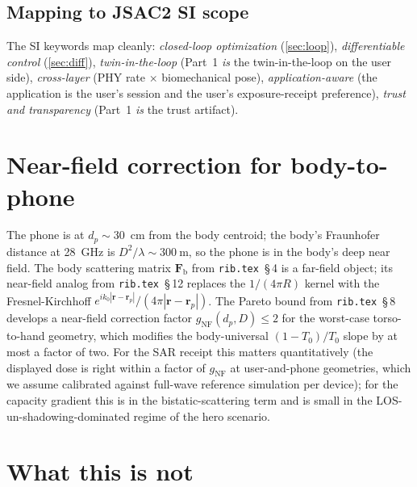 \documentclass[11pt,a4paper]{article}
\theoremstyle{definition}
\newcommand{\rr}{\mathbf{r}}
\newcommand{\Frib}{\mathbf{F}_{\mathrm{b}}}
\begin{document}
\subsection{Mapping to JSAC2 SI scope}

The SI keywords map cleanly: \emph{closed-loop optimization}
(\cref{sec:loop}), \emph{differentiable control} (\cref{sec:diff}),
\emph{twin-in-the-loop} (Part~1 \emph{is} the twin-in-the-loop on
the user side), \emph{cross-layer} (PHY rate $\times$ biomechanical
pose), \emph{application-aware} (the application is the user's
session and the user's exposure-receipt preference), \emph{trust
and transparency} (Part~1 \emph{is} the trust artifact).

\section{Near-field correction for body-to-phone}\label{sec:nearfield}

The phone is at $d_p\sim$\SI{30}{\cm} from the body centroid; the
body's Fraunhofer distance at \SI{28}{\GHz} is
$D^2/\lambda\sim\SI{300}{\m}$, so the phone is in the body's deep
near field.  The body scattering matrix $\Frib$ from
\texttt{rib.tex}~\S\,4 is a far-field object; its near-field
analog from \texttt{rib.tex}~\S\,12 replaces the $1/(4\pi R)$
kernel with the Fresnel-Kirchhoff
$e^{ik_0|\rr-\rr_p|}/(4\pi|\rr-\rr_p|)$.  The Pareto bound from
\texttt{rib.tex}~\S\,8 develops a near-field correction factor
$g_{\mathrm{NF}}(d_p,D)\le 2$ for the worst-case torso-to-hand
geometry, which modifies the body-universal $(1-T_0)/T_0$ slope by
at most a factor of two.  For the SAR receipt this matters
quantitatively (the displayed dose is right within a factor of
$g_{\mathrm{NF}}$ at user-and-phone geometries, which we assume
calibrated against full-wave reference simulation per device); for
the capacity gradient this is in the bistatic-scattering term and
is small in the LOS-un-shadowing-dominated regime of the hero
scenario.

\section{What this is not}\label{sec:notthis}
\end{document}
